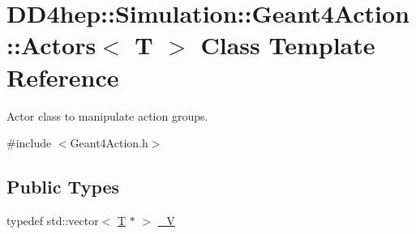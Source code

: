 \hypertarget{class_d_d4hep_1_1_simulation_1_1_geant4_action_1_1_actors}{
\section{DD4hep::Simulation::Geant4Action::Actors$<$ T $>$ Class Template Reference}
\label{class_d_d4hep_1_1_simulation_1_1_geant4_action_1_1_actors}
}


Actor class to manipulate action groups.  


{\ttfamily \#include $<$Geant4Action.h$>$}\subsection*{Public Types}
\begin{DoxyCompactItemize}
\item 
typedef std::vector$<$ \hyperlink{class_t}{T} $\ast$ $>$ \hyperlink{class_d_d4hep_1_1_simulation_1_1_geant4_action_1_1_actors_a18b6dfb1542a2cd036d8317db48f6c16}{\_\-V}
\end{DoxyCompactItemize}
